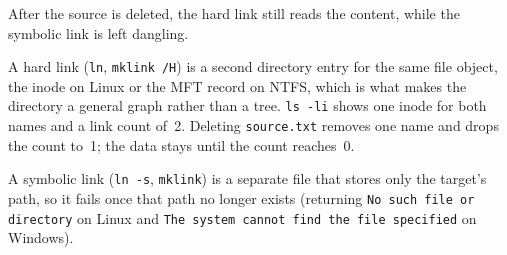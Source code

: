 
After the source is deleted, the hard link still reads the content, while the
symbolic link is left dangling.

A hard link (\texttt{ln}, \texttt{mklink /H}) is a second directory entry for
the same file object, the inode on Linux or the MFT record on NTFS, which is
what makes the directory a general graph rather than a tree. \texttt{ls -li}
shows one inode for both names and a link count of~2. Deleting
\texttt{source.txt} removes one name and drops the count to~1; the data stays
until the count reaches~0.

A symbolic link (\texttt{ln -s}, \texttt{mklink}) is a separate file that stores
only the target's path, so it fails once that path no longer exists (returning
\texttt{No such file or directory} on Linux and
\texttt{The system cannot find the file specified} on Windows).
